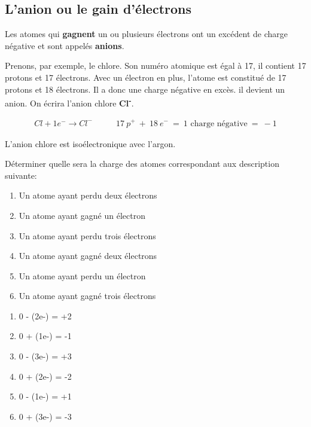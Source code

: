 \documentclass[
  11pt,
  french,
  a4paper,
  openany]{book}
\providecommand{\tightlist}{%
  \setlength{\itemsep}{0pt}\setlength{\parskip}{0pt}}
\begin{document}
\hypertarget{lanion-ou-le-gain-duxe9lectrons}{%
\subsection{L'anion ou le gain d'électrons}\label{lanion-ou-le-gain-duxe9lectrons}}

Les atomes qui \textbf{gagnent} un ou plusieurs électrons ont un excédent de charge négative et sont appelés \textbf{anions}.

Prenons, par exemple, le chlore. Son numéro atomique est égal à 17, il contient 17 protons et 17 électrons. Avec un électron en plus, l'atome est constitué de 17 protons et 18 électrons. Il a donc une charge négative en excès. il devient un anion. On écrira l'anion chlore \textbf{Cl\textsuperscript{-}}.

\[ \begin{split}
        Cl + 1e^- \rightarrow Cl^-
    \end{split}
    \qquad
    \begin{split}
        17\:p^{+}\:+\:18\:e^{-}\:=\:\text{1 charge négative}\:=\: -1
    \end{split} \]

L'anion chlore est isoélectronique avec l'argon.

\begin{Exercise}

Déterminer quelle sera la charge des atomes correspondant aux description suivante:

\begin{enumerate}
\def\labelenumi{\arabic{enumi}.}
\tightlist
\item
  Un atome ayant perdu deux électrons\\
\item
  Un atome ayant gagné un électron\\
\item
  Un atome ayant perdu trois électrons\\
\item
  Un atome ayant gagné deux électrons\\
\item
  Un atome ayant perdu un électron\\
\item
  Un atome ayant gagné trois électrons
\end{enumerate}


\end{Exercise}

\begin{Answer}

\begin{enumerate}
\def\labelenumi{\arabic{enumi}.}
\tightlist
\item
  0 - (2e-) = +2
\item
  0 + (1e-) = -1
\item
  0 - (3e-) = +3
\item
  0 + (2e-) = -2
\item
  0 - (1e-) = +1
\item
  0 + (3e-) = -3
\end{enumerate}

\newpage


\end{Answer}
\end{document}
